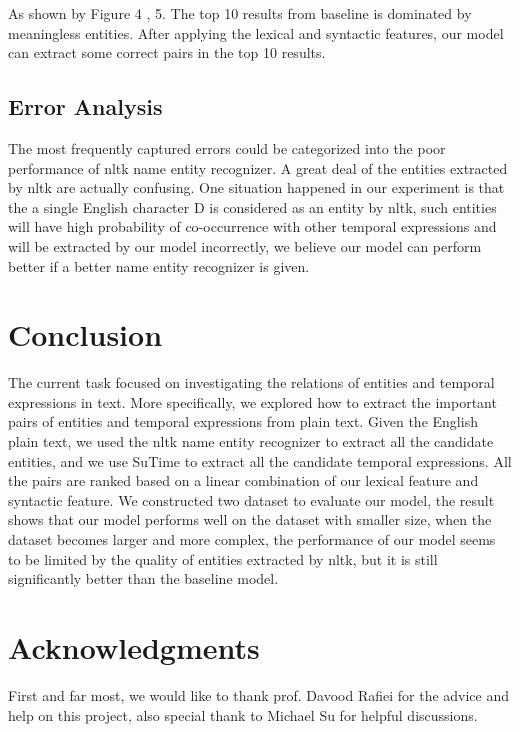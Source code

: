 \documentclass[12pt,a4paper]{article}
\begin{document}
As shown by Figure 4 , 5. The top 10 results from baseline is dominated by meaningless entities. After applying the lexical and syntactic features, our model can extract some correct pairs in the top 10 results.
\subsection{Error Analysis}
The most frequently captured errors could be categorized into the poor performance of nltk name entity recognizer. A great deal of the entities extracted by nltk are actually confusing. One situation happened in our experiment is that the a single English character D is considered as an entity by nltk, such entities will have high probability of co-occurrence with other temporal expressions and will be extracted by our model incorrectly, we believe our model can perform better if a better name entity recognizer is given.

\section{Conclusion}
The current task focused on investigating the relations of entities and temporal expressions in text. More specifically, we explored how to extract the important pairs of entities and temporal expressions from plain text. Given the English plain text, we used the nltk \cite{nltk} name entity recognizer to extract all the candidate entities, and we use SuTime \cite{SuTime} to extract all the candidate temporal expressions. All the pairs are ranked based on a linear combination of our lexical feature and syntactic feature. We constructed two dataset to evaluate our model, the result shows that our model performs well on the dataset with smaller size, when the dataset becomes larger and more complex, the performance of our model seems to be limited by the quality of entities extracted by nltk, but it is still significantly better than the baseline model. 
\section*{Acknowledgments}

First and far most, we would like to thank prof. Davood Rafiei for the advice and help on this project, also special thank to Michael Su for helpful discussions.



\end{document}
